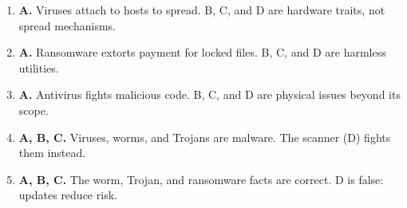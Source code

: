 \documentclass[11pt]{article}
\begin{document}
\begin{enumerate}[label=\textbf{Q\arabic*.}, leftmargin=*]
\item \textbf{A.} Viruses attach to hosts to spread. B, C, and D are hardware traits, not spread mechanisms.
\item \textbf{A.} Ransomware extorts payment for locked files. B, C, and D are harmless utilities.
\item \textbf{A.} Antivirus fights malicious code. B, C, and D are physical issues beyond its scope.
\item \textbf{A, B, C.} Viruses, worms, and Trojans are malware. The scanner (D) fights them instead.
\item \textbf{A, B, C.} The worm, Trojan, and ransomware facts are correct. D is false: updates reduce risk.
\end{enumerate}
\def\JKSSBLessonID{42}\def\JKSSBAnswers{1}
\end{document}
